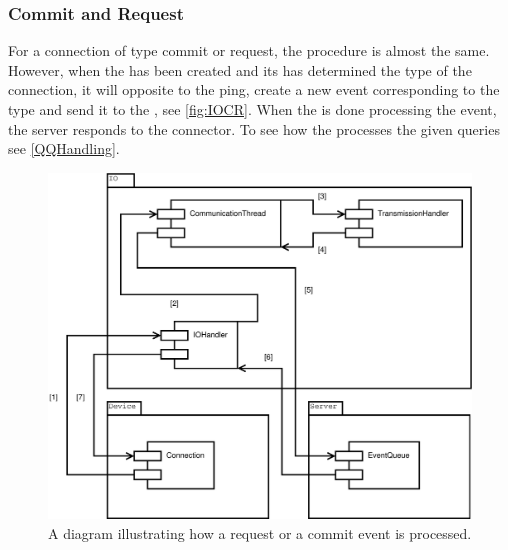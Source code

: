 \subsubsection*{Commit and Request}
For a connection of type commit or request, the procedure is almost the same. However, when the  has been created and its  has determined the type of the connection, it will opposite to the ping, create a new event corresponding to the type and send it to the , see \autoref{fig:IOCR}.
When the  is done processing the event, the server responds to the connector.
To see how the  processes the given queries see \autoref{QQHandling}.

\begin{figure}[htbp]
	\centering
		\includegraphics[scale=0.40]{images/requestCommit}
	\caption{A diagram illustrating how a request or a commit event is processed.}
	\label{fig:IOCR}
\end{figure}